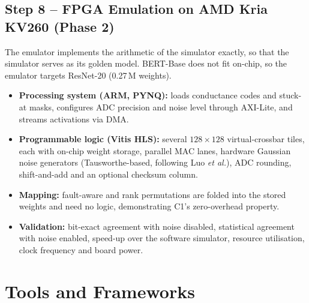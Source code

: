 \documentclass[10pt,a4paper]{article}
\begin{document}
\subsection{Step 8 -- FPGA Emulation on AMD Kria KV260 (Phase 2)}
The emulator implements the arithmetic of the simulator exactly, so that the simulator serves as its
golden model. BERT-Base does not fit on-chip, so the emulator targets ResNet-20 (0.27\,M weights).
\begin{itemize}
\item \textbf{Processing system (ARM, PYNQ):} loads conductance codes and stuck-at masks, configures ADC
precision and noise level through AXI-Lite, and streams activations via DMA.
\item \textbf{Programmable logic (Vitis HLS):} several $128\times128$ virtual-crossbar tiles, each with
on-chip weight storage, parallel MAC lanes, hardware Gaussian noise generators (Tausworthe-based,
following Luo \emph{et al.}), ADC rounding, shift-and-add and an optional checksum column.
\item \textbf{Mapping:} fault-aware and rank permutations are folded into the stored weights and need
no logic, demonstrating C1's zero-overhead property.
\item \textbf{Validation:} bit-exact agreement with noise disabled, statistical agreement with noise
enabled, speed-up over the software simulator, resource utilisation, clock frequency and board power.
\end{itemize}

\section{Tools and Frameworks}
\end{document}
